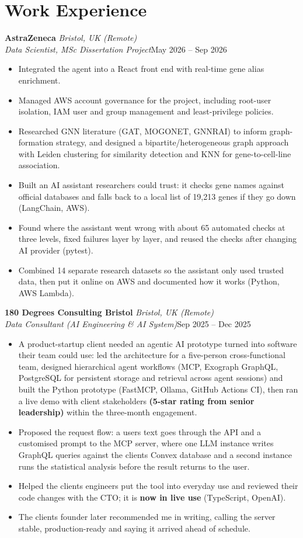 \documentclass[a4paper,11pt]{article}
\newcommand{\role}[4]{%
  \textbf{#1}{\color{muted}\,\textperiodcentered\,\textit{#2}}\\
  \textit{#4}\hfill{\color{muted}#3}\par}
\newcommand{\gap}{\vspace{5pt}}
\newcommand{\num}[1]{\textbf{#1}}   %
\begin{document}
\section{Work Experience}
\role{AstraZeneca}{Bristol, UK (Remote)}{May 2026 – Sep 2026}{Data Scientist, MSc Dissertation Project}
\begin{itemize}
  \item Integrated the agent into a React front end with real-time gene alias enrichment.
  \item Managed AWS account governance for the project, including root-user isolation, IAM user and group management and least-privilege policies.
  \item Researched GNN literature (GAT, MOGONET, GNNRAI) to inform graph-formation strategy, and designed a bipartite/heterogeneous graph approach with Leiden clustering for similarity detection and KNN for gene-to-cell-line association.
  \item Built an AI assistant researchers could trust: it checks gene names against official databases and falls back to a local list of 19,213 genes if they go down (LangChain, AWS).
  \item Found where the assistant went wrong with about 65 automated checks at three levels, fixed failures layer by layer, and reused the checks after changing AI provider (pytest).
  \item Combined 14 separate research datasets so the assistant only used trusted data, then put it online on AWS and documented how it works (Python, AWS Lambda).
\end{itemize}
\gap
{}
\role{180 Degrees Consulting Bristol}{Bristol, UK (Remote)}{Sep 2025 – Dec 2025}{Data Consultant (AI Engineering \& AI System)}
\begin{itemize}
  \item A product-startup client needed an agentic AI prototype turned into software their team could use: led the architecture for a five-person cross-functional team, designed hierarchical agent workflows (MCP, Exograph GraphQL, PostgreSQL for persistent storage and retrieval across agent sessions) and built the Python prototype (FastMCP, Ollama, GitHub Actions CI), then ran a live demo with client stakeholders \num{(5-star rating from senior leadership)} within the three-month engagement.
  \item Proposed the request flow: a user\textquotesingle{}s text goes through the API and a customised prompt to the MCP server, where one LLM instance writes GraphQL queries against the client\textquotesingle{}s Convex database and a second instance runs the statistical analysis before the result returns to the user.
  \item Helped the client\textquotesingle{}s engineers put the tool into everyday use and reviewed their code changes with the CTO; it is \num{now in live use} (TypeScript, OpenAI).
  \item The client\textquotesingle{}s founder later recommended me in writing, calling the server \textquotesingle{}stable, production-ready\textquotesingle{} and saying it arrived ahead of schedule.
\end{itemize}
\end{document}
